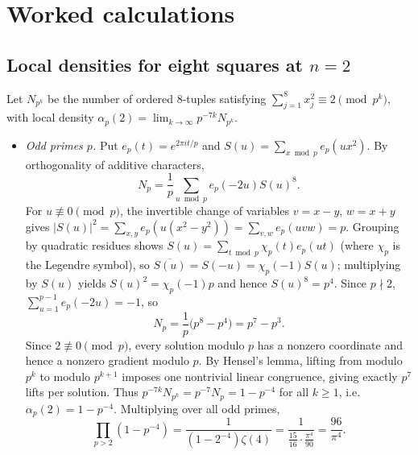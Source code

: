 \section{Worked calculations}
\label{sec:appC-calculations}

\subsection{Local densities for eight squares at \texorpdfstring{$n=2$}{n = 2}}

Let $N_{p^k}$ be the number of ordered $8$-tuples satisfying $\sum_{j=1}^{8}x_j^2\equiv 2\pmod{p^k}$, with local density $\alpha_p(2)=\lim_{k\to\infty}p^{-7k}N_{p^k}$.

\begin{itemize}
\item \emph{Odd primes $p$.} Put $e_p(t)=e^{2\pi it/p}$ and $S(u)=\sum_{x\bmod p}e_p(ux^2)$. By orthogonality of additive characters,
\[
N_p=\frac{1}{p}\sum_{u\bmod p}e_p(-2u)S(u)^8.
\]
For $u\not\equiv 0\pmod p$, the invertible change of variables $v=x-y$, $w=x+y$ gives $|S(u)|^2=\sum_{x,y}e_p(u(x^2-y^2))=\sum_{v,w}e_p(uvw)=p$. Grouping by quadratic residues shows $S(u)=\sum_{t\bmod p}\chi_p(t)e_p(ut)$ (where $\chi_p$ is the Legendre symbol), so $\overline{S(u)}=S(-u)=\chi_p(-1)S(u)$; multiplying by $S(u)$ yields $S(u)^2=\chi_p(-1)p$ and hence $S(u)^8=p^4$. Since $p\nmid 2$, $\sum_{u=1}^{p-1}e_p(-2u)=-1$, so
\[
N_p=\frac{1}{p}\bigl(p^8-p^4\bigr)=p^7-p^3.
\]
Since $2\not\equiv 0\pmod p$, every solution modulo $p$ has a nonzero coordinate and hence a nonzero gradient modulo $p$. By Hensel's lemma, lifting from modulo $p^k$ to modulo $p^{k+1}$ imposes one nontrivial linear congruence, giving exactly $p^7$ lifts per solution. Thus $p^{-7k}N_{p^k}=p^{-7}N_p=1-p^{-4}$ for all $k\ge 1$, i.e.\ $\alpha_p(2)=1-p^{-4}$. Multiplying over all odd primes,
\[
\prod_{p>2}(1-p^{-4})=\frac{1}{(1-2^{-4})\zeta(4)}=\frac{1}{\frac{15}{16}\cdot\frac{\pi^4}{90}}=\frac{96}{\pi^4}.
\]


\end{itemize}
